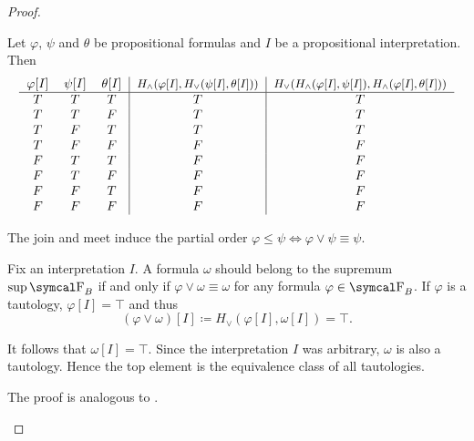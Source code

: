 \begin{proof}
\begin{description}
     Let \( \varphi \), \( \psi \) and \( \theta \) be propositional formulas and \( I \) be a propositional interpretation. Then
    \begin{equation*}
      \begin{tabular}{c c c | c | c}
        \( \varphi[I] \) & \( \psi[I] \) & \( \theta[I] \) & \small{\( H_\wedge(\varphi[I], H_\vee(\psi[I], \theta[I])) \)} & \small{\( H_\vee(H_\wedge(\varphi[I], \psi[I]), H_\wedge(\varphi[I], \theta[I])) \)} \\
        \hline
        \( T \)          & \( T \)       & \( T \)         & \( T \)                                               & \( T \)    \\
        \( T \)          & \( T \)       & \( F \)         & \( T \)                                               & \( T \)    \\
        \( T \)          & \( F \)       & \( T \)         & \( T \)                                               & \( T \)    \\
        \( T \)          & \( F \)       & \( F \)         & \( F \)                                               & \( F \)    \\
        \( F \)          & \( T \)       & \( T \)         & \( F \)                                               & \( F \)    \\
        \( F \)          & \( T \)       & \( F \)         & \( F \)                                               & \( F \)    \\
        \( F \)          & \( F \)       & \( T \)         & \( F \)                                               & \( F \)    \\
        \( F \)          & \( F \)       & \( F \)         & \( F \)                                               & \( F \)
      \end{tabular}
    \end{equation*}
  \end{description}

  The join and meet induce the partial order \( \varphi \leq \psi \iff \varphi \vee \psi \equiv \psi \).

  \begin{description}
     Fix an interpretation \( I \). A formula \( \omega \) should belong to the supremum \( \sup \CF_B \) if and only if \( \varphi \vee \omega \equiv \omega \) for any formula \( \varphi \in \CF_B \). If \( \varphi \) is a tautology, \( \varphi[I] = \top \) and thus
    \begin{equation*}
      (\varphi \vee \omega)[I] \coloneqq H_\vee(\varphi[I], \omega[I]) = \top.
    \end{equation*}

    It follows that \( \omega[I] = \top \). Since the interpretation \( I \) was arbitrary, \( \omega \) is also a tautology. Hence the top element is the equivalence class of all tautologies.

     The proof is analogous to .
  \end{description}
\end{proof}

